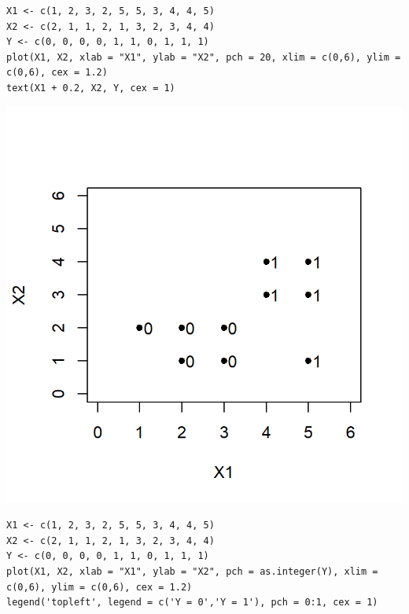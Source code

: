 \begin{minipage}{0.45\textwidth}
	\begin{lstlisting}
X1 <- c(1, 2, 3, 2, 5, 5, 3, 4, 4, 5)
X2 <- c(2, 1, 1, 2, 1, 3, 2, 3, 4, 4)
Y <- c(0, 0, 0, 0, 1, 1, 0, 1, 1, 1)
plot(X1, X2, xlab = "X1", ylab = "X2", pch = 20, xlim = c(0,6), ylim = c(0,6), cex = 1.2)
text(X1 + 0.2, X2, Y, cex = 1)
	\end{lstlisting}
	\begin{center}
		\includegraphics[width=\linewidth]{"Temas/Imágenes/Tema 3/screenshot003"}
	\end{center}
\end{minipage}\qquad\begin{minipage}{0.5\textwidth}
\begin{lstlisting}
X1 <- c(1, 2, 3, 2, 5, 5, 3, 4, 4, 5)
X2 <- c(2, 1, 1, 2, 1, 3, 2, 3, 4, 4)
Y <- c(0, 0, 0, 0, 1, 1, 0, 1, 1, 1)
plot(X1, X2, xlab = "X1", ylab = "X2", pch = as.integer(Y), xlim = c(0,6), ylim = c(0,6), cex = 1.2)
legend('topleft', legend = c('Y = 0','Y = 1'), pch = 0:1, cex = 1)
\end{lstlisting}
\begin{center}

\end{center}
\end{minipage}
